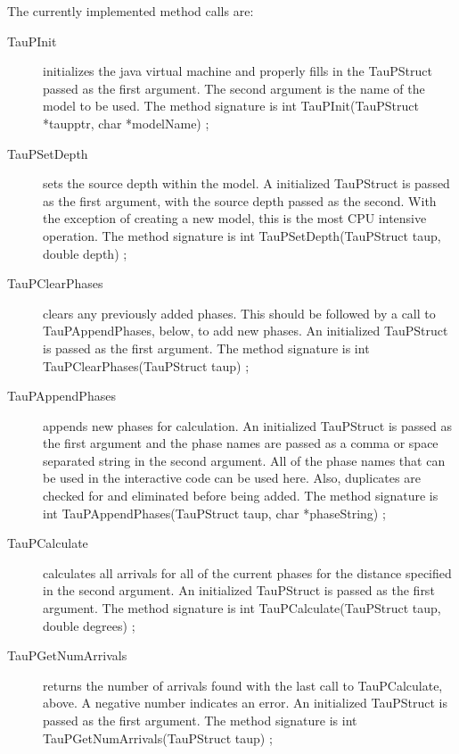 The currently implemented method calls are:
\begin{center}
\begin{description}
\item[TauPInit] initializes the java virtual machine and properly fills in
the TauPStruct passed as the first argument. The second argument is the
name of the model to be used. The method signature is\newline
int TauPInit(TauPStruct *taupptr, char *modelName) {};

\item[TauPSetDepth] sets the source depth within the model. A initialized
TauPStruct is passed as the first argument, with the source depth
passed as the second. With the exception of creating a new model, this is
the most CPU intensive operation.
The method signature is\newline
int TauPSetDepth(TauPStruct taup, double depth) {};

\item[TauPClearPhases] clears any previously added phases. This should be
followed by a call to TauPAppendPhases, below, to add new phases.
An initialized TauPStruct is passed as the first argument.
The method signature is\newline
int TauPClearPhases(TauPStruct taup) {};

\item[TauPAppendPhases] appends new phases for calculation.
An initialized TauPStruct is passed as the first argument
and the phase names are passed as a comma or space separated string
in the second argument. All of the phase names that can be used in the
interactive code can be used here. Also, duplicates are checked for and
eliminated before being added. The method signature is\newline
int TauPAppendPhases(TauPStruct taup, char *phaseString) {};

\item[TauPCalculate] calculates all arrivals for all of the current
phases for the distance specified in the second argument.
An initialized TauPStruct is passed as the first argument.
The method signature is\newline
int TauPCalculate(TauPStruct taup, double degrees) {};

\item[TauPGetNumArrivals] returns the number of arrivals found with
the last call to TauPCalculate, above. A negative number indicates an
error. An initialized TauPStruct is passed as the first argument.
The method signature is\newline
int TauPGetNumArrivals(TauPStruct taup) {};


\end{description}
\end{center}
